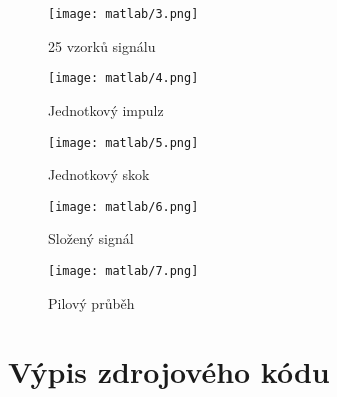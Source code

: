 \documentclass[11pt, a4paper]{article}
\begin{document}
        \begin{figure}[H]
            \centering
            \begin{minipage}{.5\textwidth}
                \centering
                \texttt{[image: matlab/3.png]}
                \caption{25 vzorků signálu}
                \label{fig:graf3}
            \end{minipage}%
            \begin{minipage}{.5\textwidth}
                \centering
                \texttt{[image: matlab/4.png]}
                \caption{Jednotkový impulz}
                \label{fig:graf4}
            \end{minipage}
        \end{figure}
        
        \begin{figure}[H]
            \centering
            \begin{minipage}{.5\textwidth}
                \centering
                \texttt{[image: matlab/5.png]}
                \caption{Jednotkový skok}
                \label{fig:graf5}
            \end{minipage}%
            \begin{minipage}{.5\textwidth}
                \centering
                \texttt{[image: matlab/6.png]}
                \caption{Složený signál}
                \label{fig:graf6}
            \end{minipage}
        \end{figure}
        
        \begin{figure}[H]
            \centering
            \texttt{[image: matlab/7.png]}
            \caption{Pilový průběh}
            \label{fig:graf7}
        \end{figure}
    
    \section{Výpis zdrojového kódu}
    
\end{document}

